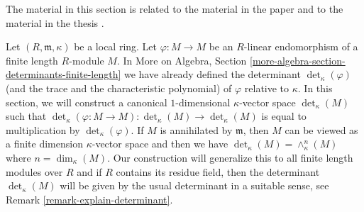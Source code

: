 \noindent
The material in this section is related to the material in
the paper \cite{determinant} and to the material in the
thesis \cite{Joe}.

\medskip\noindent
Let $(R, \mathfrak m, \kappa)$ be a local ring. Let
$\varphi : M \to M$ be an $R$-linear endomorphism of
a finite length $R$-module $M$. In More on Algebra, Section
\ref{more-algebra-section-determinants-finite-length}
we have already defined the determinant $\det_\kappa(\varphi)$
(and the trace and the characteristic polynomial)
of $\varphi$ relative to $\kappa$. In this section, we will
construct a canonical $1$-dimensional $\kappa$-vector space
$\det_\kappa(M)$ such that
$\det_\kappa(\varphi : M \to M) : \det_\kappa(M) \to \det_\kappa(M)$
is equal to multiplication by $\det_\kappa(\varphi)$.
If $M$ is annihilated by $\mathfrak m$, then $M$ can be viewed
as a finite dimension $\kappa$-vector space and then we have
$\det_\kappa(M) = \wedge^n_\kappa(M)$ where $n = \dim_\kappa(M)$.
Our construction will generalize this to all finite length modules
over $R$ and if $R$ contains its residue field, then the determinant
$\det_\kappa(M)$ will be given by the usual determinant in a suitable
sense, see Remark \ref{remark-explain-determinant}.

